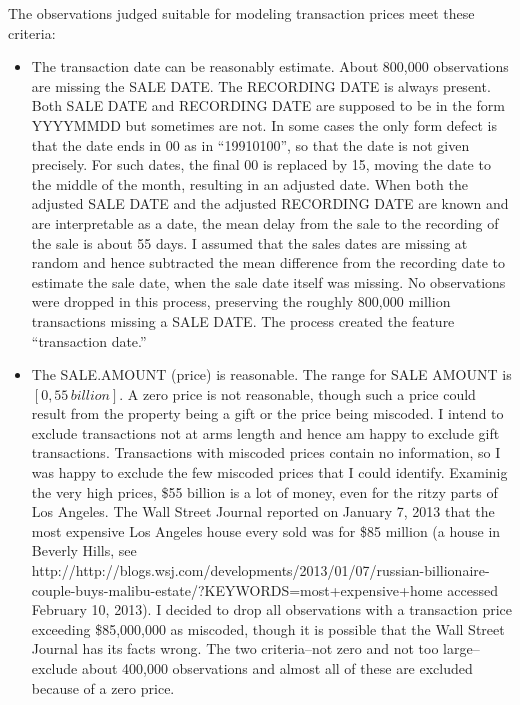 The observations judged suitable for modeling transaction prices meet
these criteria:
\begin{itemize}

\item The transaction date can be reasonably estimate. About 800,000
  observations are missing the SALE DATE. The RECORDING DATE is always
  present. Both SALE DATE and RECORDING DATE are supposed to be in the
  form YYYYMMDD but sometimes are not. In some cases the only form
  defect is that the date ends in 00 as in ``19910100'', so that the
  date is not given precisely. For such dates, the final 00 is
  replaced by 15, moving the date to the middle of the month,
  resulting in an adjusted date. When both the adjusted SALE DATE and
  the adjusted RECORDING DATE are known and are interpretable as a
  date, the mean delay from the sale to the recording of
  the sale is about 55 days. I assumed that the sales dates are
  missing at random and hence subtracted the mean difference from the
  recording date to estimate the sale date, when the sale date itself
  was missing. No observations were dropped in this process,
  preserving the roughly 800,000 million transactions missing a SALE
  DATE. The process created the feature ``transaction date.''

\item The SALE.AMOUNT (price) is reasonable. The range for SALE AMOUNT
  is $[0, 55 \, billion]$. A zero price is not reasonable, though such a
  price could result from the property being a gift or the price being
  miscoded. I intend to exclude transactions not at arms length and hence
  am happy to exclude gift transactions. Transactions with miscoded prices
  contain no information, so I was happy to exclude the few miscoded prices
  that I could identify. Examinig the very high prices, \$55 billion is 
  a lot of money, even for the ritzy parts
  of Los Angeles. The Wall Street Journal reported on January 7, 2013
  that the most expensive Los Angeles house every sold was for \$85
  million (a house in Beverly Hills, see
  http://http://blogs.wsj.com/developments/2013/01/07/russian-billionaire-couple-buys-malibu-estate/?KEYWORDS=most+expensive+home
  accessed February 10, 2013). I decided to drop all observations
  with a transaction price exceeding \$85,000,000 as miscoded, though it
  is possible that the Wall Street Journal has its facts wrong. The two
  criteria--not zero and not too large--exclude about 400,000
  observations and almost all of these are excluded because of a zero
  price.


\end{itemize}
